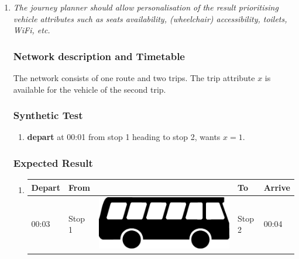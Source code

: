 \documentclass[a4paper,11pt]{article}
\newcommand*{\bus}{\includegraphics[scale=0.02]{img/bus}}
\begin{document}
\begin{enumerate}
\begin{enumerate}

\item \textit{The journey planner should allow personalisation of the result prioritising vehicle attributes such as seats availability, (wheelchair) accessibility, toilets, WiFi, etc.}
\subsubsection*{Network description and Timetable}
The network consists of one route and two trips.
The trip attribute $x$ is available for the vehicle of the second trip.

\begin{figure}[h]
\vspace{1em}
\raggedleft
\begin{minipage}{205pt}
\end{minipage}
\label{fig:attributes_network}
\vspace{-2em}
\end{figure}

\subsubsection*{Synthetic Test}
\begin{enumerate}
\item \textbf{depart} at 00:01 from stop 1 heading to stop 2, wants $x = 1$.
\end{enumerate}

\subsubsection*{Expected Result}
\begin{enumerate}
\item
{\scriptsize
\begin{tabular}{p{.75cm} | p{3.0cm} c p{3.0cm} | p{.75cm} }
\hline
\rowcolor{Gray}
Depart & From & & To & Arrive \\
\hline
00:03 & Stop 1 & \bus & Stop 2 & 00:04 \\
\hline
\end{tabular}
}
\end{enumerate}
\newpage


\end{enumerate}
\end{enumerate}
\end{document}
